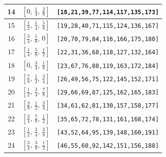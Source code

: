 \documentclass[fleqn,8pt]{jsarticle}
\begin{document}
\begin{longtable}{ccc}
14 & $\left[ 0,\, \frac{1}{4},\, \frac{3}{8} \right]$ & {\tt [18,21,39,77,114,117,135,173]} \\ \hline
15 & $\left[ \frac{1}{2},\, \frac{1}{4},\, \frac{5}{8} \right]$ & {\tt [19,28,40,71,115,124,136,167]} \\ \hline
16 & $\left[ \frac{3}{4},\, \frac{1}{8},\, 0 \right]$ & {\tt [20,70,79,84,116,166,175,180]} \\ \hline
17 & $\left[ \frac{1}{4},\, \frac{5}{8},\, \frac{1}{2} \right]$ & {\tt [22,31,36,68,118,127,132,164]} \\ \hline
18 & $\left[ 0,\, \frac{3}{4},\, \frac{1}{8} \right]$ & {\tt [23,67,76,88,119,163,172,184]} \\ \hline
19 & $\left[ \frac{7}{8},\, \frac{1}{2},\, \frac{3}{4} \right]$ & {\tt [26,49,56,75,122,145,152,171]} \\ \hline
20 & $\left[ \frac{1}{2},\, \frac{3}{4},\, \frac{7}{8} \right]$ & {\tt [29,66,69,87,125,162,165,183]} \\ \hline
21 & $\left[ \frac{3}{8},\, \frac{1}{2},\, \frac{3}{4} \right]$ & {\tt [34,61,62,81,130,157,158,177]} \\ \hline
22 & $\left[ \frac{3}{4},\, \frac{7}{8},\, \frac{1}{2} \right]$ & {\tt [35,65,72,78,131,161,168,174]} \\ \hline
23 & $\left[ \frac{1}{2},\, \frac{3}{4},\, \frac{3}{8} \right]$ & {\tt [43,52,64,95,139,148,160,191]} \\ \hline
24 & $\left[ \frac{3}{4},\, \frac{3}{8},\, \frac{1}{2} \right]$ & {\tt [46,55,60,92,142,151,156,188]} \\
\end{longtable}
\renewcommand{\arraystretch}{1.2}
\end{document}
